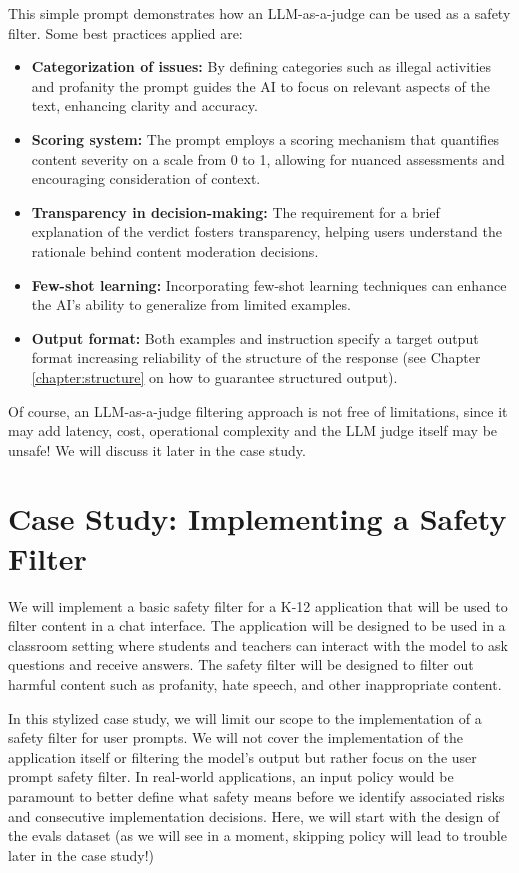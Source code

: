 This simple prompt demonstrates how an LLM-as-a-judge can be used as a safety filter. Some best practices applied are:
\begin{itemize}
\item \textbf{Categorization of issues:} By defining categories such as illegal activities and profanity the prompt guides the AI to focus on relevant aspects of the text, enhancing clarity and accuracy.
\item \textbf{Scoring system:} The prompt employs a scoring mechanism that quantifies content severity on a scale from 0 to 1, allowing for nuanced assessments and encouraging consideration of context.
\item \textbf{Transparency in decision-making:} The requirement for a brief explanation of the verdict fosters transparency, helping users understand the rationale behind content moderation decisions.
\item \textbf{Few-shot learning:} Incorporating few-shot learning techniques can enhance the AI's ability to generalize from limited examples.
\item \textbf{Output format:} Both examples and instruction specify a target output format increasing reliability of the structure of the response (see Chapter \ref{chapter:structure} on how to guarantee structured output).
\end{itemize}

Of course, an LLM-as-a-judge filtering approach is not free of limitations, since it may add latency, cost, operational complexity and the LLM judge itself may be unsafe! We will discuss it later in the case study.

\section{Case Study: Implementing a Safety Filter}

We will implement a basic safety filter for a K-12 application that will be used to filter content in a chat interface. The application will be designed to be used in a classroom setting where students and teachers can interact with the model to ask questions and receive answers. The safety filter will be designed to filter out harmful content such as profanity, hate speech, and other inappropriate content.

In this stylized case study, we will limit our scope to the implementation of a safety filter for user prompts. We will not cover the implementation of the application itself or filtering the model's output but rather focus on the user prompt safety filter. In real-world applications, an input policy would be paramount to better define what safety means before we identify associated risks and consecutive implementation decisions. Here, we will start with the design of the evals dataset (as we will see in a moment, skipping policy will lead to trouble later in the case study!)


